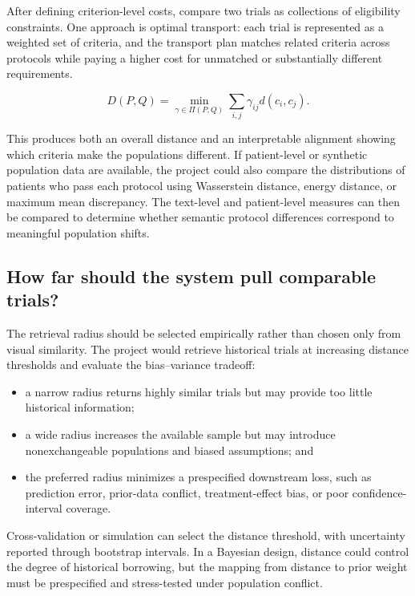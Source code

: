 \documentclass[11pt]{article}
\begin{document}
After defining criterion-level costs, compare two trials as collections of eligibility constraints. One approach is optimal transport: each trial is represented as a weighted set of criteria, and the transport plan matches related criteria across protocols while paying a higher cost for unmatched or substantially different requirements.

\[
D(P,Q)
=
\min_{\gamma \in \Pi(P,Q)}
\sum_{i,j}\gamma_{ij}d(c_i,c_j).
\]

This produces both an overall distance and an interpretable alignment showing which criteria make the populations different. If patient-level or synthetic population data are available, the project could also compare the distributions of patients who pass each protocol using Wasserstein distance, energy distance, or maximum mean discrepancy. The text-level and patient-level measures can then be compared to determine whether semantic protocol differences correspond to meaningful population shifts.

\subsection*{How far should the system pull comparable trials?}

The retrieval radius should be selected empirically rather than chosen only from visual similarity. The project would retrieve historical trials at increasing distance thresholds and evaluate the bias--variance tradeoff:

\begin{itemize}
    \item a narrow radius returns highly similar trials but may provide too little historical information;
    \item a wide radius increases the available sample but may introduce nonexchangeable populations and biased assumptions; and
    \item the preferred radius minimizes a prespecified downstream loss, such as prediction error, prior-data conflict, treatment-effect bias, or poor confidence-interval coverage.
\end{itemize}

Cross-validation or simulation can select the distance threshold, with uncertainty reported through bootstrap intervals. In a Bayesian design, distance could control the degree of historical borrowing, but the mapping from distance to prior weight must be prespecified and stress-tested under population conflict.
\end{document}
